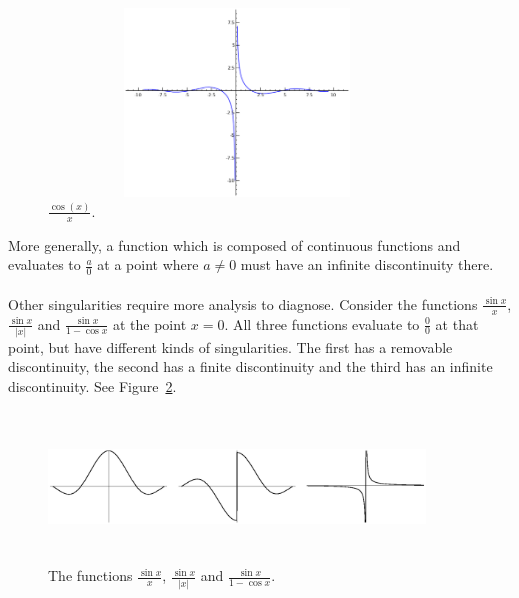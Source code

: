\begin{figure}[h!]
\begin{minipage}{\textwidth}
\begin{center}
\includegraphics[height=5cm,width=10cm]{cosoverx.eps}
\end{center}
\end{minipage}
\caption{$\frac{\cos(x)}{x}$.}
\label{fig:cosoverx}
\end{figure}

\noindent
More generally, a function which is composed of continuous
functions and evaluates to $\frac{a}{0}$ at a point where $a \neq 0$ must
have an infinite discontinuity there.

\paragraph{}
Other singularities require more analysis to diagnose.  Consider the 
functions $\frac{\sin x}{x}$, $\frac{\sin x}{|x|}$ and 
$\frac{\sin x}{1 - \cos x}$ at the point $x = 0$.  All three functions
evaluate to $\frac{0}{0}$ at that point, but have different kinds
of singularities.  The first has a removable discontinuity, the second has
a finite discontinuity and the third has an infinite discontinuity.
See Figure~\ref{disc3}.

\begin{figure}[h!]
\begin{minipage}{\textwidth}
\begin{center}
\includegraphics[height=4cm,width=10cm]{disc3.eps}
\end{center}
\end{minipage}
\caption{The functions $\frac{\sin x}{x}$, $\frac{\sin x}{|x|}$ and
    $\frac{\sin x}{1 - \cos x}$.}
\label{fig:disc3}
\label{disc3}
\end{figure}

